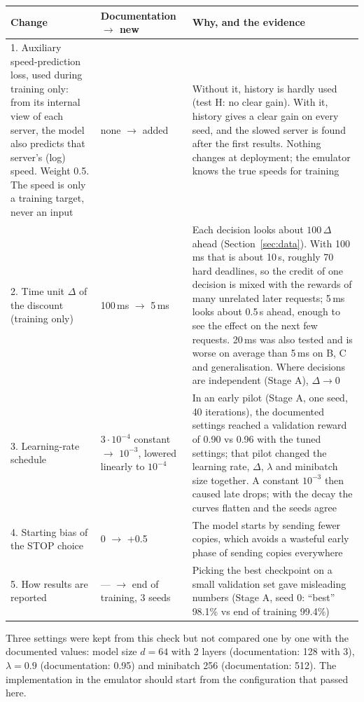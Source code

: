 \documentclass[10pt,a4paper]{article}
\newcommand{\hdr}[1]{\textsf{\textbf{#1}}}
\begin{document}
\begingroup\small
\begin{tabularx}{\textwidth}{@{}P{4.4cm}P{3.3cm}L@{}}
\toprule
\hdr{Change} & \hdr{Documentation $\to$ new} & \hdr{Why, and the evidence}\\. Auxiliary speed-prediction loss, used during training only: from its internal view of each server, the model also predicts that server's (log) speed. Weight 0.5. The speed is only a training target, never an input & none $\to$ added & Without it, history is hardly used (test H: no clear gain). With it, history gives a clear gain on every seed, and the slowed server is found after the first results. Nothing changes at deployment; the emulator knows the true speeds for training\\
2. Time unit $\Delta$ of the discount (training only) & 100\,ms $\to$ 5\,ms & Each decision looks about $100\,\Delta$ ahead (Section~\ref{sec:data}). With 100\,ms that is about 10\,s, roughly 70 hard deadlines, so the credit of one decision is mixed with the rewards of many unrelated later requests; 5\,ms looks about 0.5\,s ahead, enough to see the effect on the next few requests. 20\,ms was also tested and is worse on average than 5\,ms on B, C and generalisation. Where decisions are independent (Stage A), $\Delta\to0$\\
3. Learning-rate schedule & $3\cdot10^{-4}$ constant $\to$ $10^{-3}$, lowered linearly to $10^{-4}$ & In an early pilot (Stage A, one seed, 40 iterations), the documented settings reached a validation reward of 0.90 vs 0.96 with the tuned settings; that pilot changed the learning rate, $\Delta$, $\lambda$ and minibatch size together. A constant $10^{-3}$ then caused late drops; with the decay the curves flatten and the seeds agree\\
4. Starting bias of the STOP choice & 0 $\to$ +0.5 & The model starts by sending fewer copies, which avoids a wasteful early phase of sending copies everywhere\\
5. How results are reported & --- $\to$ end of training, 3 seeds & Picking the best checkpoint on a small validation set gave misleading numbers (Stage A, seed 0: ``best'' 98.1\% vs end of training 99.4\%)\\
\bottomrule
\end{tabularx}
\endgroup
{\small Three settings were kept from this check but not compared one by one with the documented values: model size $d=64$ with 2
layers (documentation: 128 with 3), $\lambda=0.9$ (documentation: 0.95) and minibatch 256 (documentation: 512). The implementation in the emulator should start from the
configuration that passed here.}
\end{document}
